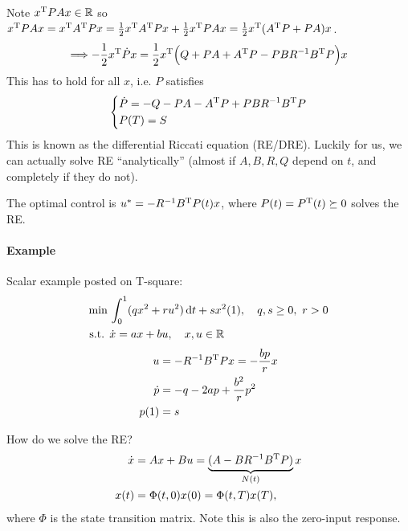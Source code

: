 Note $x^\text{T} PAx\in\mathbb{R}$ so $x^\text{T} PAx = x^\text{T} A^\text{T} Px = \frac12 x^\text{T} A^\text{T} Px + \frac12 x^\text{T} PAx = \frac12 x^\text{T} (A^\text{T} P + PA)x$.
\begin{gather}
  \Longrightarrow -\frac12 x^\text{T} \dot P x = \frac12 x^\text{T} \Big( Q + PA + A^\text{T} P - PBR^{-1}B^\text{T} P \Big) x
\end{gather}
This has to hold for all $x$, i.e. $P$ satisfies
\begin{gather}
  \begin{dcases}
    \dot P = - Q - PA - A^\text{T} P + PBR^{-1}B^\text{T} P \\
    P(T) = S
  \end{dcases}
\end{gather}
This is known as the differential Riccati equation (RE/DRE). Luckily for us, we can actually solve RE ``analytically'' (almost if $A,B,R,Q$ depend on $t$, and completely if they do not).

\begin{thm}
  The optimal control is $u^* = -R^{-1}B^\text{T} P(t) x$, where $P(t)=P^\text{T}(t)\succeq 0$ solves the RE.
\end{thm}

\paragraph{Example} Scalar example posted on T-square:
\begin{align}
  \min {} & \int_0^1 (qx^2 + ru^2)\dif t + sx^2(1), \quad q,s\ge 0,\ r>0 \\
  \text{s.t. } & \dot x = ax + bu, \quad x,u\in\R
\end{align}
\begin{align}
  u &= -R^{-1}B^\text{T} Px = -\frac{bp}{r} x \\
  \dot p &= -q - 2ap + \frac{b^2}{r}p^2 \\
  p(1) &= s
\end{align}

How do we solve the RE?
\begin{align}
  \dot x &= Ax + Bu = \underbrace{(A-BR^{-1}B^\text{T} P)}_{N(t)} x \\
  x(t) &= \Phi(t,0) x(0) = \Phi(t,T) x(T),
\end{align}
where $\Phi$ is the state transition matrix. Note this is also the zero-input response.

